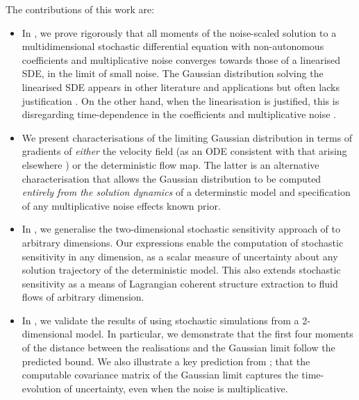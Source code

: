 The contributions of this work are:
\begin{itemize}
    \item In , we prove rigorously that all moments of the noise-scaled solution to a multidimensional stochastic differential equation with non-autonomous coefficients and multiplicative noise converges towards those of a linearised SDE, in the limit of small noise. 
    The Gaussian distribution solving the linearised SDE appears in other literature and applications but often lacks justification \cite{Jazwinski_2014_StochasticProcessesFiltering, SarkkaSolin_2019_AppliedStochasticDifferential}. 
    On the other hand, when the linearisation is justified, this is disregarding time-dependence in the coefficients and multiplicative noise \cite{Sanz-AlonsoStuart_2017_GaussianApproximationsSmall}.
    
    \item We present characterisations of the limiting Gaussian distribution in terms of gradients of \emph{either} the velocity field (as an ODE consistent with that arising elsewhere \cite{Jazwinski_2014_StochasticProcessesFiltering, Sanz-AlonsoStuart_2017_GaussianApproximationsSmall, SarkkaSolin_2019_AppliedStochasticDifferential}) or the deterministic flow map. 
    The latter is an alternative characterisation that allows the Gaussian distribution to be computed \emph{entirely from the solution dynamics} of a determinstic model and specification of any multiplicative noise effects known prior.

    \item In , we generalise the two-dimensional stochastic sensitivity approach of \cite{Balasuriya_2020_StochasticSensitivityComputable} to arbitrary dimensions.  
    Our expressions enable the computation of stochastic sensitivity in any dimension, as a scalar measure of uncertainty about any solution trajectory of the deterministic model.
    This also extends stochastic sensitivity as a means of Lagrangian coherent structure extraction to fluid flows of arbitrary dimension.

    \item In , we validate the results of  using stochastic simulations from a 2-dimensional model.
    In particular, we demonstrate that the first four moments of the distance between the realisations and the Gaussian limit follow the predicted bound.
    We also illustrate a key prediction from ; that the computable covariance matrix of the Gaussian limit captures the time-evolution of uncertainty, even when the noise is multiplicative.
    
\end{itemize}

